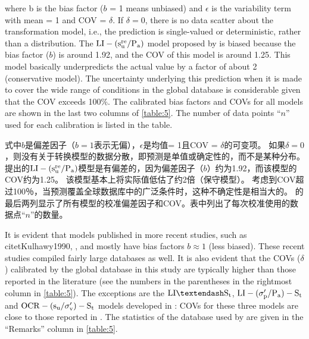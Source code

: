 \begin{paracol}{2}
    
    where b is the bias factor ($b$ = 1 means unbiased) and $\epsilon$ is the variability term with mean = 1 and COV = $\delta$. If $\delta = 0$, there is no data scatter about the transformation model, i.e., the prediction is single-valued or deterministic, rather than a distribution. The $\rm{LI}-(s_u^{re}/P_a)$ model proposed by \citet{Locat1988799} is biased because the bias factor ($b$) is around 1.92, and the COV of this model is around 1.25. This model basically underpredicts the actual value by a factor of about 2 (conservative model). The uncertainty underlying this prediction when it is made to cover the wide range of conditions in the global database is considerable given that the COV exceeds 100$\%$. The calibrated bias factors and COVs for all models are shown in the last two columns of \autoref{table:5}. The number of data points “$n$” used for each calibration is listed in the table.
    
    \switchcolumn
    
    式中$b$是偏差因子（$b = 1$表示无偏），$\epsilon$是均值= 1且COV = $ \delta $的可变项。 如果$ \delta = 0 $，则没有关于转换模型的数据分散，即预测是单值或确定性的，而不是某种分布。 \citet{Locat1988799}提出的$\rm{LI}-(s_u^{re}/P_a)$模型是有偏差的，因为偏差因子（$b$）约为1.92，而该模型的COV约为1.25。 该模型基本上将实际值低估了约2倍（保守模型）。 考虑到COV超过100％，当预测覆盖全球数据库中的广泛条件时，这种不确定性是相当大的。 的最后两列显示了所有模型的校准偏差因子和COV。表中列出了每次校准使用的数据点“$n$”的数量。
    
    
    \switchcolumn*
    
    It is evident that models published in more recent studies, such as citet{Kulhawy1990}, \citet{Chen1996488}, and \citet{Ching201252, Ching2012522} mostly have bias factors $b\approx{}1$ (less biased). These recent studies compiled fairly large databases as well. It is also evident that the COVs ($\delta$) calibrated by the global database in this study are typically higher than those reported in the literature (see the numbers in the parentheses in the rightmost column in \autoref{table:5}). The exceptions are the $\rm{LI}–S_t$, $\rm{LI}-(\sigma_p'/P_a)-S_t$ and $\rm{OCR}-(s_u/\sigma_v')-S_t$ models developed in \citet{Ching2012522}: COVs for these three models are close to those reported in \citet{Ching2012522}. The statistics of the database used by \citet{Ching2012522} are given in the “Remarks” column in \autoref{table:5}. 
    

\end{paracol}
